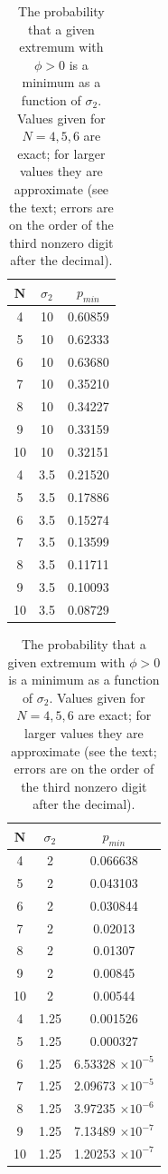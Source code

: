 \documentclass[12pt]{article}
\begin{document}
\begin{table}[h!]
  \begin{center}
    \caption{The probability that a given extremum with $\phi > 0$ is a minimum as a function of $\sigma_2$. Values given for $N=4,5,6$ are exact; for larger values they are approximate (see the text; errors are on the order of the third nonzero digit after the decimal).}
    \label{tab:table1}
    \begin{tabular}{c|c|c} %
      $\textbf{N}$ & $\sigma_2$ & $p_{min}$\\
      \hline
      4 & 10 & 0.60859\\
      5 & 10 & 0.62333\\
      6 & 10 & 0.63680\\
      7 & 10 & 0.35210\\
      8 & 10 & 0.34227\\
      9 & 10 & 0.33159\\
      10 & 10 & 0.32151\\
      \hline
      4 & 3.5 & 0.21520\\
      5 & 3.5 & 0.17886\\
      6 & 3.5 & 0.15274\\
      7 & 3.5 & 0.13599\\
      8 & 3.5 & 0.11711\\
      9 & 3.5 & 0.10093\\
      10 & 3.5 & 0.08729\\
      \end{tabular}
      \quad
      \begin{tabular}{c|c|c} 
      $\textbf{N}$ & $\sigma_2$ & $p_{min}$\\
      \hline
      4 & 2 & 0.066638\\
      5 & 2 & 0.043103\\
      6 & 2 & 0.030844\\
      7 & 2 & 0.02013\\
      8 & 2 & 0.01307\\
      9 & 2 & 0.00845\\
      10 & 2 & 0.00544\\
      \hline
      4 & 1.25 & 0.001526\\
      5 & 1.25 & 0.000327\\
      6 & 1.25 & 6.53328 $\times 10^{-5}$\\
      7 & 1.25 & 2.09673 $\times 10^{-5}$ \\
      8 & 1.25 & 3.97235  $\times 10^{-6}$ \\
      9 & 1.25 & 7.13489  $\times 10^{-7}$ \\
      10 & 1.25 & 1.20253  $\times 10^{-7}$ \\
     \end{tabular}
  \end{center}
\end{table}
\end{document}
